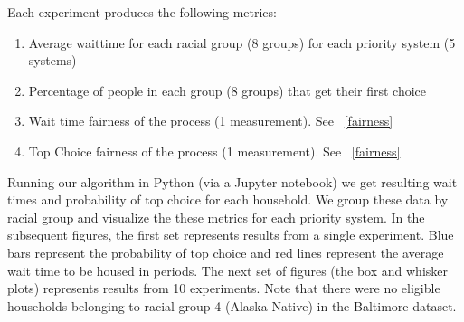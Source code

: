 \documentclass[11pt]{article}
\begin{document}
Each experiment produces the following metrics:
\begin{enumerate}
\item Average waittime for each racial group (8 groups) for each priority system (5 systems) 
\item Percentage of people in each group (8 groups) that get their first choice
\item Wait time fairness of the process (1 measurement). See ~\autoref{fairness}
\item Top Choice fairness of the process (1 measurement). See ~\autoref{fairness}
\end{enumerate}

Running our algorithm in Python (via a Jupyter notebook) we get resulting wait times and probability of top choice for each household. We group these data by racial group and visualize the these metrics for each priority system. In the subsequent figures, the first set represents results from a single experiment. Blue bars represent the probability of top choice and red lines represent the average wait time to be housed in periods. The next set of figures (the box and whisker plots) represents results from 10 experiments. Note that there were no eligible households belonging to racial group 4 (Alaska Native) in the Baltimore dataset. 
\end{document}
